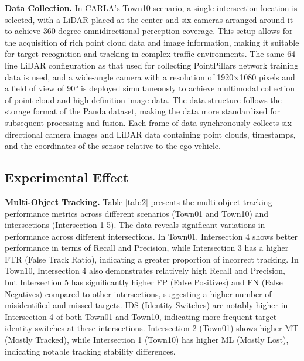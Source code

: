 \documentclass[journal,twoside,web]{ieeecolor}
\begin{document}
\textbf{Data Collection.}
In CARLA's Town10 scenario, a single intersection location is selected, with a LiDAR placed at the center and six cameras arranged around it to achieve 360-degree omnidirectional perception coverage. 
This setup allows for the acquisition of rich point cloud data and image information, making it suitable for target recognition and tracking in complex traffic environments. 
The same 64-line LiDAR configuration as that used for collecting PointPillars network training data is used, and a wide-angle camera with a resolution of 1920\(\times\)1080 pixels and a field of view of 90° is deployed simultaneously to achieve multimodal collection of point cloud and high-definition image data.
The data structure follows the storage format of the Panda dataset, making the data more standardized for subsequent processing and fusion\cite{Alpher21c}.
Each frame of data synchronously collects six-directional camera images and LiDAR data containing point clouds, timestamps, and the coordinates of the sensor relative to the ego-vehicle.

\subsection{Experimental Effect}

\textbf{Multi-Object Tracking.}
Table \ref{tab:2} presents the multi-object tracking performance metrics across different scenarios (Town01 and Town10) and intersections (Intersection 1-5). 
The data reveals significant variations in performance across different intersections. 
In Town01, Intersection 4 shows better performance in terms of Recall and Precision, while Intersection 3 has a higher FTR (False Track Ratio), indicating a greater proportion of incorrect tracking. 
In Town10, Intersection 4 also demonstrates relatively high Recall and Precision, but Intersection 5 has significantly higher FP (False Positives) and FN (False Negatives) compared to other intersections, suggesting a higher number of misidentified and missed targets. 
IDS (Identity Switches) are notably higher in Intersection 4 of both Town01 and Town10, indicating more frequent target identity switches at these intersections. 
Intersection 2 (Town01) shows higher MT (Mostly Tracked), while Intersection 1 (Town10) has higher ML (Mostly Lost), indicating notable tracking stability differences.
\end{document}
